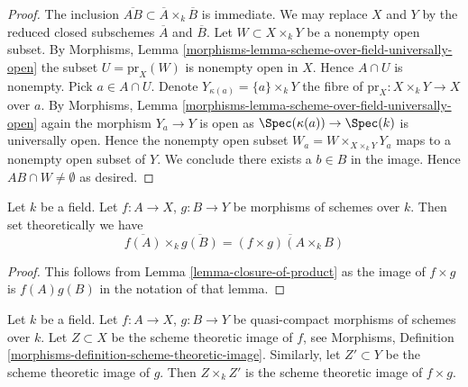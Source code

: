 \begin{proof}
The inclusion $\overline{AB} \subset \overline{A} \times_k \overline{B}$
is immediate.
We may replace $X$ and $Y$ by the reduced closed subschemes $\overline{A}$
and $\overline{B}$.
Let $W \subset X \times_k Y$ be a nonempty open subset. By
Morphisms, Lemma \ref{morphisms-lemma-scheme-over-field-universally-open}
the subset $U = \text{pr}_X(W)$ is nonempty open in $X$.
Hence $A \cap U$ is nonempty. Pick $a \in A \cap U$.
Denote $Y_{\kappa(a)} = \{a\} \times_k Y$
the fibre of $\text{pr}_X : X \times_k Y \to X$ over $a$. By
Morphisms, Lemma \ref{morphisms-lemma-scheme-over-field-universally-open}
again the morphism $Y_a \to Y$ is open as
$\Spec(\kappa(a)) \to \Spec(k)$ is universally open.
Hence the nonempty open
subset $W_a = W \times_{X \times_k Y} Y_a$
maps to a nonempty open subset of $Y$.
We conclude there exists a $b \in B$ in the image.
Hence $AB \cap W \not = \emptyset$ as desired.
\end{proof}

\begin{lemma}
\label{lemma-closure-image-product-map}
Let $k$ be a field.
Let $f : A \to X$, $g : B \to Y$ be morphisms of schemes over $k$.
Then set theoretically we have
$$
\overline{f(A)} \times_k \overline{g(B)} =
\overline{(f \times g)(A \times_k B)}
$$
\end{lemma}

\begin{proof}
This follows from
Lemma \ref{lemma-closure-of-product}
as the image of $f \times g$ is $f(A)g(B)$
in the notation of that lemma.
\end{proof}

\begin{lemma}
\label{lemma-scheme-theoretic-image-product-map}
Let $k$ be a field.
Let $f : A \to X$, $g : B \to Y$ be quasi-compact morphisms of schemes
over $k$. Let $Z \subset X$ be the scheme theoretic image of $f$, see
Morphisms, Definition \ref{morphisms-definition-scheme-theoretic-image}.
Similarly, let $Z' \subset Y$ be the scheme theoretic image of $g$.
Then $Z \times_k Z'$ is the scheme theoretic image of $f \times g$.
\end{lemma}

